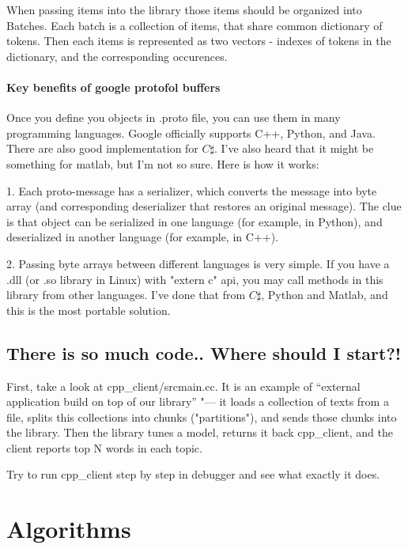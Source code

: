 \documentclass[11pt,a4paper,twoside]{report}
\begin{document}
When passing items into the library those items should be organized into Batches.
Each batch is a collection of items, that share common dictionary of tokens.
Then each items is represented as two vectors - indexes of tokens in the dictionary,
and the corresponding occurences.

\paragraph{Key benefits of google protofol buffers}

Once you define you objects in .proto file, you can use them in many programming languages. 
Google officially supports C++, Python, and Java. There are also good implementation for $C\sharp$.
I've also heard that it might be something for matlab, but I'm not so sure. Here is how it works:

1. Each proto-message has a serializer, which converts the message into byte array
(and corresponding deserializer that restores an original message).
The clue is that object can be serialized in one language (for example, in Python),
and deserialized in another language (for example, in C++).

2. Passing byte arrays between different languages is very simple.
If you have a .dll (or .so library in Linux) with "extern c" api,
you may call methods in this library from other languages.
I've done that from $C\sharp$, Python and Matlab,
and this is the most portable solution.

\subsection{There is so much code.. Where should I start?!}

First, take a look at cpp\_client/srcmain.cc. 
It is an example of ``external application build on top of our library'' "---
it loads a collection of texts from a file,
splits this collections into chunks ("partitions"),
and sends those chunks into the library.
Then the library tunes a model,
returns it back  cpp\_client,
and the client reports top N words in each topic.

Try to run cpp\_client step by step in debugger and see what exactly it does.

\section{Algorithms}
\end{document}
